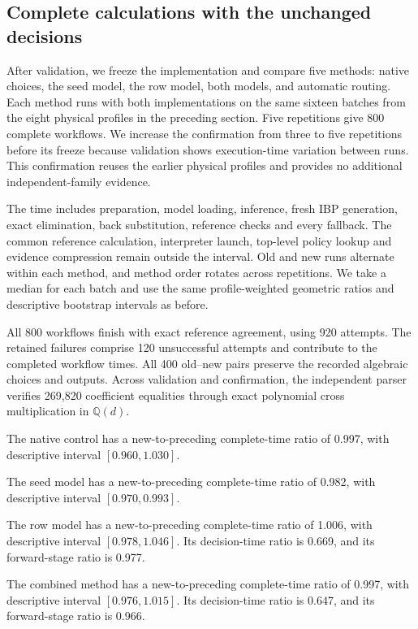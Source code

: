 \begin{samepage}
\subsection{Complete calculations with the unchanged decisions}
After validation, we freeze the implementation and compare five methods:
native choices, the seed model, the row model, both models, and automatic
routing. Each method runs with both implementations on the same sixteen
batches from the eight physical profiles in the preceding section.
Five repetitions give 800 complete workflows. We increase the confirmation
from three to five repetitions before its freeze because validation shows
execution-time variation between runs. This confirmation reuses the earlier
physical profiles and provides no additional independent-family evidence.
\par\end{samepage}

The time includes preparation, model loading, inference, fresh IBP generation,
exact elimination, back substitution, reference checks and every fallback.
The common reference calculation, interpreter launch, top-level policy lookup
and evidence compression remain outside the interval. Old and new runs
alternate within each method, and method order rotates across repetitions.
We take a median for each batch and use the same profile-weighted geometric
ratios and descriptive bootstrap intervals as before.

All 800 workflows finish with exact reference agreement, using 920 attempts. The retained failures comprise 120 unsuccessful attempts and contribute to the completed workflow times. All 400 old--new pairs preserve the recorded algebraic choices and outputs. Across validation and confirmation, the independent parser verifies 269,820 coefficient equalities through exact polynomial cross multiplication in $\mathbb Q(d)$.

The native control has a new-to-preceding complete-time ratio of 0.997, with descriptive interval $[0.960,1.030]$.

The seed model has a new-to-preceding complete-time ratio of 0.982, with descriptive interval $[0.970,0.993]$.

The row model has a new-to-preceding complete-time ratio of 1.006, with descriptive interval $[0.978,1.046]$. Its decision-time ratio is 0.669, and its forward-stage ratio is 0.977.

The combined method has a new-to-preceding complete-time ratio of 0.997, with descriptive interval $[0.976,1.015]$. Its decision-time ratio is 0.647, and its forward-stage ratio is 0.966.

